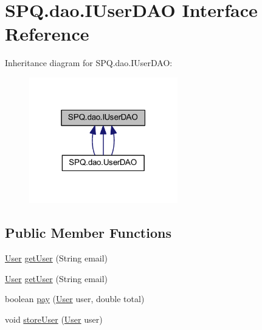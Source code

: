 \hypertarget{interface_s_p_q_1_1dao_1_1_i_user_d_a_o}{}\section{S\+P\+Q.\+dao.\+I\+User\+D\+AO Interface Reference}
\label{interface_s_p_q_1_1dao_1_1_i_user_d_a_o}


Inheritance diagram for S\+P\+Q.\+dao.\+I\+User\+D\+AO\+:
\nopagebreak
\begin{figure}[H]
\begin{center}
\leavevmode
\includegraphics[width=183pt]{interface_s_p_q_1_1dao_1_1_i_user_d_a_o__inherit__graph}
\end{center}
\end{figure}
\subsection*{Public Member Functions}
\begin{DoxyCompactItemize}
\item 
\mbox{\hyperlink{class_s_p_q_1_1data_1_1_user}{User}} \mbox{\hyperlink{interface_s_p_q_1_1dao_1_1_i_user_d_a_o_ac53b137d5e0828058457e59fa70c2b95}{get\+User}} (String email)
\item 
\mbox{\hyperlink{class_s_p_q_1_1data_1_1_user}{User}} \mbox{\hyperlink{interface_s_p_q_1_1dao_1_1_i_user_d_a_o_ac53b137d5e0828058457e59fa70c2b95}{get\+User}} (String email)
\item 
boolean \mbox{\hyperlink{interface_s_p_q_1_1dao_1_1_i_user_d_a_o_a8a4257a186a80d5842e26aeb1140a402}{pay}} (\mbox{\hyperlink{class_s_p_q_1_1data_1_1_user}{User}} user, double total)
\item 
void \mbox{\hyperlink{interface_s_p_q_1_1dao_1_1_i_user_d_a_o_a286f084c9e920d1ce196658ab63ab0af}{store\+User}} (\mbox{\hyperlink{class_s_p_q_1_1data_1_1_user}{User}} user)
\end{DoxyCompactItemize}


